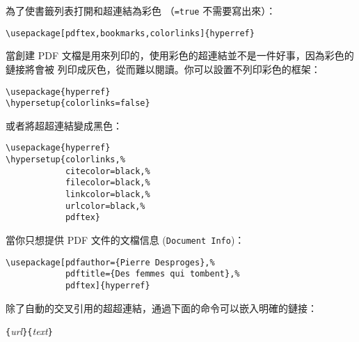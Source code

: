 
為了使書籤列表打開和超連結為彩色 （\texttt{=true} 不需要寫出來）：
\begin{code}
\begin{verbatim}
\usepackage[pdftex,bookmarks,colorlinks]{hyperref}
\end{verbatim}
\end{code}


當創建 PDF 文檔是用來列印的，使用彩色的超連結並不是一件好事，因為彩色的鏈接將會被
列印成灰色，從而難以閱讀。你可以設置不列印彩色的框架：
\begin{code}
\begin{verbatim}
\usepackage{hyperref}
\hypersetup{colorlinks=false}
\end{verbatim}
\end{code}
\noindent 或者將超超連結變成黑色：
\begin{code}
\begin{verbatim}
\usepackage{hyperref}
\hypersetup{colorlinks,%
            citecolor=black,%
            filecolor=black,%
            linkcolor=black,%
            urlcolor=black,%
            pdftex}
\end{verbatim}
\end{code}


當你只想提供 PDF 文件的文檔信息 (\texttt{Document Info})：
\begin{code}
\begin{verbatim}
\usepackage[pdfauthor={Pierre Desproges},%
            pdftitle={Des femmes qui tombent},%
            pdftex]{hyperref}
\end{verbatim}
\end{code}

\vspace{\baselineskip}

除了自動的交叉引用的超超連結，通過下面的命令可以嵌入明確的鏈接：
\begin{lscommand}
\verb|{|\emph{url}\verb|}{|\emph{text}\verb|}|
\end{lscommand}

